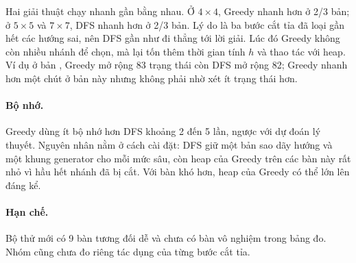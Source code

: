 Hai giải thuật chạy nhanh gần bằng nhau. Ở $4\times4$, Greedy nhanh hơn ở 2/3
bản; ở $5\times5$ và $7\times7$, DFS nhanh hơn ở 2/3 bản. Lý do là ba bước cắt
tỉa đã loại gần hết các hướng sai, nên DFS gần như đi thẳng tới lời giải.
Lúc đó Greedy không còn nhiều nhánh để chọn, mà lại tốn thêm thời gian tính $h$
và thao tác với heap. Ví dụ ở bản , Greedy mở rộng 83 trạng
thái còn DFS mở rộng 82; Greedy nhanh hơn một chút ở bản này nhưng không phải
nhờ xét ít trạng thái hơn.

\paragraph{Bộ nhớ.} Greedy dùng ít bộ nhớ hơn DFS khoảng 2 đến 5 lần, ngược với
dự đoán lý thuyết. Nguyên nhân nằm ở cách cài đặt: DFS giữ một bản sao dãy hướng
và một khung generator cho mỗi mức sâu, còn heap của Greedy trên các bàn này rất
nhỏ vì hầu hết nhánh đã bị cắt. Với bàn khó hơn, heap của Greedy có thể lớn lên
đáng kể.

\paragraph{Hạn chế.} Bộ thử mới có 9 bàn tương đối dễ và chưa có bàn vô nghiệm
trong bảng đo. Nhóm cũng chưa đo riêng tác dụng của từng bước cắt tỉa.
